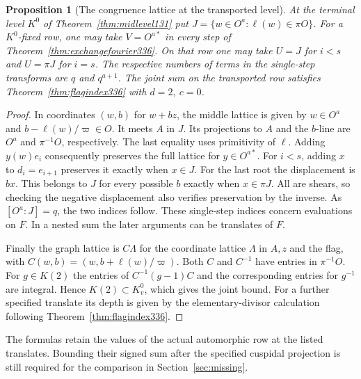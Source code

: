 \documentclass[a4paper,11pt]{article}
\newtheorem{proposition}{Proposition}[section]
\theoremstyle{definition}
\theoremstyle{remark}
\numberwithin{equation}{section}
\begin{document}
\begin{proposition}[The congruence lattice at the transported level]\label{prop:graphexchange336}
At the terminal level \(K^0\) of Theorem~\ref{thm:midlevel131}
put \(J=\{w\in O^a:\ell(w)\in\pi O\}\). For a \(K^0\)-fixed row,
one may take \(V=O^{a*}\) in every step of
Theorem~\ref{thm:exchangefourier336}. On that row one may take
\(U=J\) for \(i<s\) and \(U=\pi J\) for \(i=s\). The respective
numbers of terms in the single-step transforms are \(q\) and
\(q^{a+1}\). The joint sum on the transported row satisfies
Theorem~\ref{thm:flagindex336} with \(d=2,\ c=0\).
\end{proposition}
\begin{proof}
In coordinates \((w,b)\) for \(w+bz\), the middle lattice
is given by \(w\in O^a\) and
\(b-\ell(w)/\varpi\in O\). It meets \(A\) in \(J\).
Its projections to \(A\) and the \(b\)-line are \(O^a\)
and \(\pi^{-1}O\), respectively. The last equality uses
primitivity of \(\ell\). Adding \(y(w)e_i\) consequently
preserves the full lattice for \(y\in O^{a*}\).
For \(i<s\), adding \(x\) to \(d_i=e_{i+1}\) preserves it
exactly when \(x\in J\). For the last root the displacement
is \(b x\). This belongs to \(J\) for every possible \(b\)
exactly when \(x\in\pi J\). All are shears, so checking
the negative displacement also verifies preservation by the
inverse. As \([O^a:J]=q\), the two indices follow. These
single-step indices concern evaluations on \(F\). In a nested
sum the later arguments can be translates of \(F\).

Finally the graph lattice is \(C\Lambda\) for the coordinate
lattice \(\Lambda\) in \(A,z\) and the flag, with
\(C(w,b)=(w,b+\ell(w)/\varpi)\). Both \(C\) and \(C^{-1}\)
have entries in \(\pi^{-1}O\). For \(g\in K(2)\) the entries
of \(C^{-1}(g-1)C\) and the corresponding entries for \(g^{-1}\)
are integral. Hence \(K(2)\subset K^0_v\), which gives the
joint bound. For a further specified translate its depth is
given by the elementary-divisor calculation following
Theorem~\ref{thm:flagindex336}.
\end{proof}

The formulas retain the values of the actual automorphic row
at the listed translates. Bounding their signed sum after
the specified cuspidal projection is still required for the
comparison in Section~\ref{sec:missing}.
\end{document}
